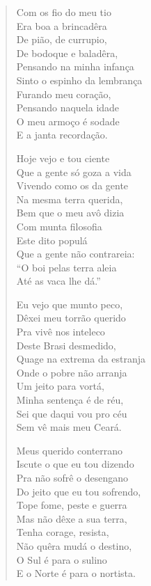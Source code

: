 \begin{verse}
Com os fio do meu tio\\
Era boa a brincadêra\\
De pião, de currupio,\\
De bodoque e baladêra,\\
Pensando na minha infança\\
Sinto o espinho da lembrança\\
Furando meu coração,\\
Pensando naquela idade\\
O meu armoço é sodade\\
E a janta recordação.

Hoje vejo e tou ciente\\
Que a gente só goza a vida\\
Vivendo como os da gente\\
Na mesma terra querida,\\
Bem que o meu avô dizia\\
Com munta filosofia\\
Este dito populá\\
Que a gente não contrareia:\\
``O boi pelas terra aleia\\
Até as vaca lhe dá.''

Eu vejo que munto peco,\\
Dêxei meu torrão querido\\
Pra vivê nos inteleco\\
Deste Brasi desmedido,\\
Quage na extrema da estranja\\
Onde o pobre não arranja\\
Um jeito para vortá,\\
Minha sentença é de réu,\\
Sei que daqui vou pro céu\\
Sem vê mais meu Ceará.

Meus querido conterrano\\
Iscute o que eu tou dizendo\\
Pra não sofrê o desengano\\
Do jeito que eu tou sofrendo,\\
Tope fome, peste e guerra\\
Mas não dêxe a sua terra,\\
Tenha corage, resista,\\
Não quêra mudá o destino,\\
O Sul é para o sulino\\
E o Norte é para o nortista.


\end{verse}
